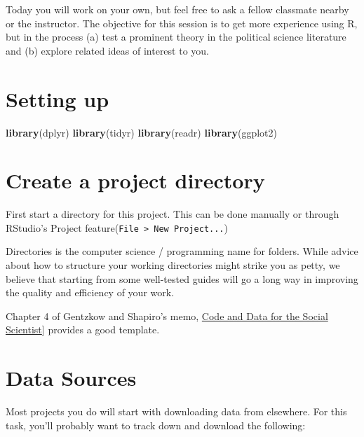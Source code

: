 \documentclass[
]{book}
\newenvironment{Shaded}{\begin{snugshade}}{\end{snugshade}}
\newcommand{\KeywordTok}[1]{\textcolor[rgb]{0.13,0.29,0.53}{\textbf{#1}}}
\newcommand{\NormalTok}[1]{#1}
\theoremstyle{definition}
\theoremstyle{definition}
\theoremstyle{definition}
\theoremstyle{definition}
\theoremstyle{remark}
\begin{document}
Today you will work on your own, but feel free to ask a fellow classmate nearby or the instructor. The objective for this session is to get more experience using R, but in the process (a) test a prominent theory in the political science literature and (b) explore related ideas of interest to you.

\hypertarget{setting-up}{%
\section{Setting up}\label{setting-up}}

\begin{Shaded}
\begin{Highlighting}[]
\KeywordTok{library}\NormalTok{(dplyr)}
\KeywordTok{library}\NormalTok{(tidyr)}
\KeywordTok{library}\NormalTok{(readr)}
\KeywordTok{library}\NormalTok{(ggplot2)}
\end{Highlighting}
\end{Shaded}

\hypertarget{create-a-project-directory}{%
\section{Create a project directory}\label{create-a-project-directory}}

First start a directory for this project. This can be done manually or through RStudio's Project feature(\texttt{File\ \textgreater{}\ New\ Project...})

Directories is the computer science / programming name for folders. While advice about how to structure your working directories might strike you as petty, we believe that starting from some well-tested guides will go a long way in improving the quality and efficiency of your work.

Chapter 4 of Gentzkow and Shapiro's memo, \href{https://web.stanford.edu/~gentzkow/research/CodeAndData.pdf}{Code and Data for the Social Scientist}{]} provides a good template.

\hypertarget{data-sources}{%
\section{Data Sources}\label{data-sources}}

Most projects you do will start with downloading data from elsewhere. For this task, you'll probably want to track down and download the following:
\end{document}
